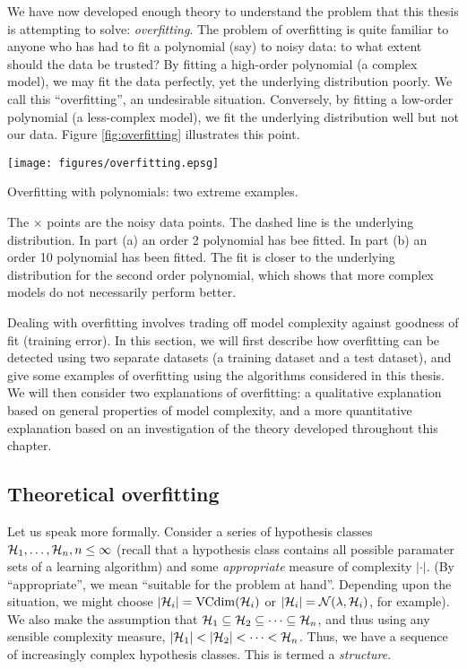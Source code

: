 We have now developed enough theory to understand the problem that
this thesis is attempting to solve: \emph{overfitting}.  The problem
of overfitting is quite familiar to anyone who has had to fit a
polynomial (say) to noisy data: to what extent should the data be
trusted?  By fitting a high-order polynomial (a complex model), we may
fit the data perfectly, yet the underlying distribution poorly.  We
call this ``overfitting'', an undesirable situation.  Conversely, by
fitting a low-order polynomial (a less-complex model), we fit the
underlying distribution well but not our data.  Figure
\ref{fig:overfitting} illustrates this point. 

\begin{linefigure}
\begin{center}
\texttt{[image: figures/overfitting.epsg]}
\end{center}
\caption{Overfitting with polynomials: two extreme examples.}
The $\times$ points are the noisy data points.  The dashed line is the
underlying distribution.  In part (a) an order 2 polynomial has bee
fitted.  In part (b) an order 10 polynomial has been fitted.  The fit
is closer to the underlying distribution for the second order
polynomial, which shows that more complex models do not necessarily
perform better.
\label{fig:overfitting}
\end{linefigure}

Dealing with overfitting involves trading off model complexity against
goodness of fit (training error).  In this section, we will first
describe how overfitting can be detected using two separate datasets
(a training dataset and a test dataset), and give some examples of
overfitting using the algorithms considered in this thesis.  We will
then consider two explanations of overfitting: a qualitative
explanation based on general properties of model complexity, and a
more quantitative explanation based on an investigation of the theory
developed throughout this chapter.

\subsection{Theoretical overfitting}

Let us speak more formally.  Consider a series of hypothesis
classes $\mathcal{H}_1, \ldots, \mathcal{H}_n, n \leq \infty$ (recall that a
hypothesis class contains all possible paramater sets of a learning
algorithm) and some \emph{appropriate} measure of complexity
$|\cdot|$.  (By ``appropriate'', we mean ``suitable for the problem at
hand''. Depending upon the situation, we might choose $|\mathcal{H}_i| =
\mathrm{VCdim}(\mathcal{H}_i)$ or $|\mathcal{H}_i| = \mathcal{N}({\lambda}, {\mathcal{H}_i})$, for
example).  We also make the assumption that $\mathcal{H}_1 \subseteq \mathcal{H}_2
\subseteq \cdots \subseteq \mathcal{H}_n$, and thus using any sensible
complexity measure, $|\mathcal{H}_1| < |\mathcal{H}_2| < \cdots < \mathcal{H}_n$.  Thus,
we have a sequence of increasingly complex hypothesis classes.  This
is termed a \emph{structure}.

